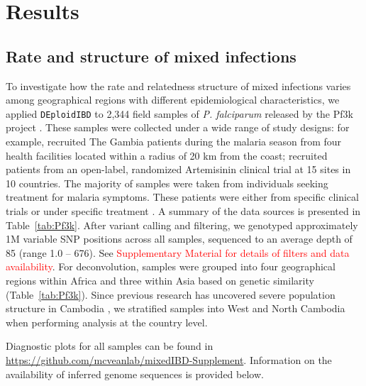 \documentclass[9pt,lineno]{elife}
\begin{document}
\section{Results}

\subsection{Rate and structure of mixed infections}

To investigate how the rate and relatedness structure of mixed infections varies among geographical regions with different epidemiological characteristics, we applied \texttt{DEploidIBD} to 2,344 field samples of {\it P. falciparum} released by the Pf3k project \citep{pf3k}.  These samples were collected under a wide range of study designs: for example, \citet{Amambua-Ngwa2012} recruited The Gambia patients during the malaria season from four health facilities located within a radius of 20 km from the coast; \citet{Ashley2014} recruited patients from an open-label, randomized Artemisinin clinical trial at 15 sites in 10 countries. The majority of samples were taken from individuals seeking treatment for malaria symptoms. These patients were either from specific clinical trials \citep{Ocholla2014} or under specific treatment \citep{Duffy2015, Miotto2013, eLife2016}.  A summary of the data sources is presented in Table~\ref{tab:Pf3k}.  After variant calling and filtering, we genotyped approximately 1M variable SNP positions across all samples, sequenced to an average depth of 85 (range 1.0 – 676).  See \textcolor{red}{Supplementary Material for details of filters and data availability}.  For deconvolution, samples were grouped into four geographical regions within Africa and three within Asia based on genetic similarity (Table~\ref{tab:Pf3k}). Since previous research has uncovered severe population structure in Cambodia \citep{Miotto2013}, we stratified samples into West and North Cambodia when performing analysis at the country level.

Diagnostic plots for all samples can be found in \url{https://github.com/mcveanlab/mixedIBD-Supplement}. Information on the availability of inferred genome sequences is provided below.
\end{document}

